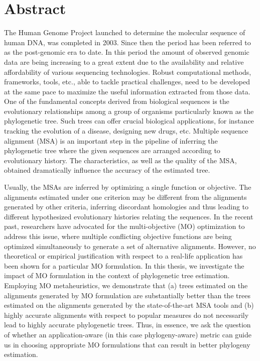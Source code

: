 \chapter*{Abstract}
The Human Genome Project launched to determine the molecular sequence of human DNA, was completed in 2003. Since then the period has been referred to as the post-genomic era to date. In this period the amount of observed genomic data are being increasing to a great extent due to the availability and relative affordability of various sequencing technologies. Robust computational methods, frameworks, tools, etc., able to tackle practical challenges, need to be developed at the same pace to maximize the useful information extracted from those data. One of the fundamental concepts derived from biological sequences is the evolutionary relationships among a group of organisms particularly known as the phylogenetic tree. Such trees can offer crucial biological applications, for instance tracking the evolution of a disease, designing new drugs, etc. Multiple sequence alignment (MSA) is an important step in the pipeline of inferring the phylogenetic tree where the given sequences are arranged according to evolutionary history. The characteristics, as well as the quality of the MSA, obtained dramatically influence the accuracy of the estimated tree. 

Usually, the MSAs are inferred by optimizing a single function or objective. The alignments estimated under one criterion may be different from the alignments generated by other criteria, inferring discordant homologies and thus leading to different hypothesized evolutionary histories relating the sequences. In the recent past, researchers have advocated for the multi-objective (MO) optimization to address this issue, where multiple conflicting objective functions are being optimized simultaneously to generate a set of alternative alignments. However, no theoretical or empirical justification with respect to a real-life application has been shown for a particular MO formulation. In this thesis, we investigate the impact of MO formulation in the context of phylogenetic tree estimation. Employing MO metaheuristics, we demonstrate that (a) trees estimated on the alignments generated by MO formulation are substantially better than the trees estimated on the alignments generated by the state-of-the-art MSA tools and (b) highly accurate alignments with respect to popular measures do not necessarily lead to highly accurate phylogenetic trees. Thus, in essence, we ask the question of whether an application-aware (in this case phylogeny-aware) metric can guide us in choosing appropriate MO formulations that can result in better phylogeny estimation. %

